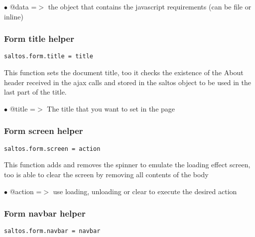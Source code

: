 \documentclass[a4paper]{article}
\begin{document}
\begin{compactitem}
\item[\color{myblue}$\bullet$] @data =$>$ the object that contains the javascript requirements (can be file or inline)
\end{compactitem}

\hypertarget{toc788}{}
\subsubsection{Form title helper}

\begin{lstlisting}
saltos.form.title = title
\end{lstlisting}

This function sets the document title, too it checks the existence of the About
header received in the ajax calls and stored in the saltos object to be used in the
last part of the title.

\begin{compactitem}
\item[\color{myblue}$\bullet$] @title =$>$ The title that you want to set in the page
\end{compactitem}

\hypertarget{toc789}{}
\subsubsection{Form screen helper}

\begin{lstlisting}
saltos.form.screen = action
\end{lstlisting}

This function adds and removes the spinner to emulate the loading effect screen, too is able
to clear the screen by removing all contents of the body

\begin{compactitem}
\item[\color{myblue}$\bullet$] @action =$>$ use loading, unloading or clear to execute the desired action
\end{compactitem}

\hypertarget{toc790}{}
\subsubsection{Form navbar helper}

\begin{lstlisting}
saltos.form.navbar = navbar
\end{lstlisting}
\end{document}
